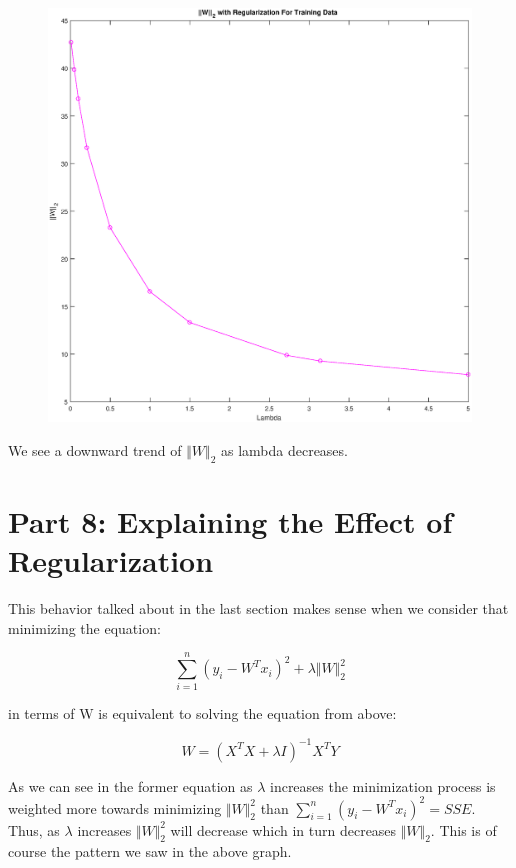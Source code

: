 \documentclass{article}
\begin{document}
	
	\begin{figure}[h!]
		\begin{center} 
			\includegraphics[scale=0.5]{lambda_norm.eps} 
		\end{center}  
		\label{fig:M3}
	\end{figure}
\newpage

We see a downward trend of $\Vert W \Vert_{2}$ as lambda decreases. 

\section*{Part 8: Explaining the Effect of Regularization}

This behavior talked about in the last section makes sense when we consider that minimizing the equation: 

$$
\sum_{i = 1}^{n} (y_{i}-W^{T} x_{i})^{2} + \lambda \Vert W \Vert_{2}^{2}
$$

in terms of W is equivalent to solving the equation from above:

$$
W = (X^{T}X + \lambda I)^{-1}X^{T}Y
$$

As we can see in the former equation as $\lambda$ increases the minimization process is weighted more towards minimizing $\Vert W \Vert_{2}^{2}$ than $\sum_{i = 1}^{n} (y_{i}-W^{T} x_{i})^{2} = SSE$. Thus, as $\lambda$ increases $\Vert W \Vert_{2}^{2}$ will decrease which in turn decreases $\Vert W \Vert_{2}$. This is of course the pattern we saw in the above graph.
	
	
	
\end{document}
